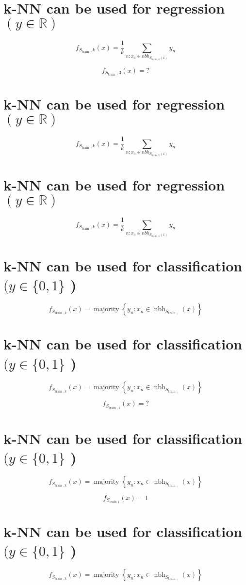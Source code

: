 \section*{k-NN can be used for regression $(y \in \mathbb{R})$}
$$
f_{S_{\text {train }}, k}(x)=\frac{1}{k} \sum_{n: x_{n} \in n b h_{S_{\text {train }, k}(x)}} y_{n}
$$


$$
f_{S_{\text {train }}, 3}(x)=?
$$

\section*{k-NN can be used for regression $(y \in \mathbb{R})$}
$$
f_{S_{\text {train }}, k}(x)=\frac{1}{k} \sum_{n: x_{n} \in n b h_{S_{\text {train }, k}(x)}} y_{n}
$$


\section*{k-NN can be used for regression $(y \in \mathbb{R})$}
$$
f_{S_{\text {train }}, k}(x)=\frac{1}{k} \sum_{n: x_{n} \in n b h_{S_{\text {train }, k}(x)}} y_{n}
$$


\section*{k-NN can be used for classification $(y \in\{0,1\}$ )}
$$
f_{S_{\text {train }, k}}(x)=\operatorname{majority}\left\{y_{n}: x_{n} \in \operatorname{nbh}_{S_{\text {train }, ~}}(x)\right\}
$$


\section*{k-NN can be used for classification $(y \in\{0,1\}$ )}
$$
f_{S_{\text {train }, k}}(x)=\operatorname{majority}\left\{y_{n}: x_{n} \in \operatorname{nbh}_{S_{\text {train }, ~}}(x)\right\}
$$


$$
f_{S_{\text {train }, 1}}(x)=?
$$

\section*{k-NN can be used for classification $(y \in\{0,1\}$ )}
$$
f_{S_{\text {train }, k}}(x)=\operatorname{majority}\left\{y_{n}: x_{n} \in \operatorname{nbh}_{S_{\text {train }, ~}}(x)\right\}
$$


$$
f_{S_{\text {train } 1}}(x)=1
$$

\section*{k-NN can be used for classification $(y \in\{0,1\}$ )}
$$
f_{S_{\text {train }, k}}(x)=\operatorname{majority}\left\{y_{n}: x_{n} \in \operatorname{nbh}_{S_{\text {train }, ~}}(x)\right\}
$$


